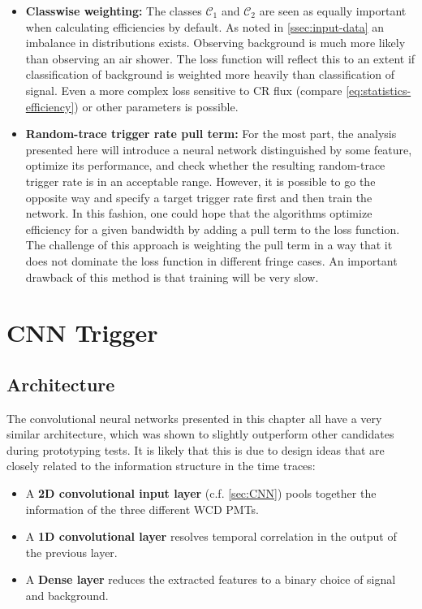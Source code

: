\begin{itemize}
	\item \textbf{Classwise weighting:} The classes $\mathcal{C}_1$ and $\mathcal{C}_2$ are seen as equally important when calculating efficiencies by default. 
	As noted in \autoref{ssec:input-data} an imbalance in distributions exists. Observing background is much more likely than observing an air shower. The loss 
	function will reflect this to an extent if classification of background is weighted more heavily than classification of signal. Even a more complex loss 
	sensitive to CR flux (compare \autoref{eq:statistics-efficiency}) or other parameters is possible.
	\item \textbf{Random-trace trigger rate pull term:} For the most part, the analysis presented here will introduce a neural network distinguished by some 
	feature, optimize its performance, and check whether the resulting random-trace trigger rate is in an acceptable range. However, it is possible to go the 
	opposite way and specify a target trigger rate first and then train the network. In this fashion, one could hope that the algorithms optimize efficiency for a
	given bandwidth by adding a pull term to the loss function. The challenge of this approach is weighting the pull term in a way that it does not dominate the 
	loss function in different fringe cases. An important drawback of this method is that training will be very slow.
\end{itemize}

\section{CNN Trigger}
\label{sec:cnn-performance}

\subsection{Architecture}
\label{ssec:cnn-architecture}

The convolutional neural networks presented in this chapter all have a very similar architecture, which was shown to slightly outperform other candidates during 
prototyping tests. It is likely that this is due to design ideas that are closely related to the information structure in the time traces:

\begin{itemize}
	\item A \textbf{2D convolutional input layer} (c.f. \autoref{sec:CNN}) pools together the information of the three different WCD PMTs.
	\item A \textbf{1D convolutional layer} resolves temporal correlation in the output of the previous layer.
	\item A \textbf{Dense layer} reduces the extracted features to a binary choice of signal and background.
\end{itemize}

